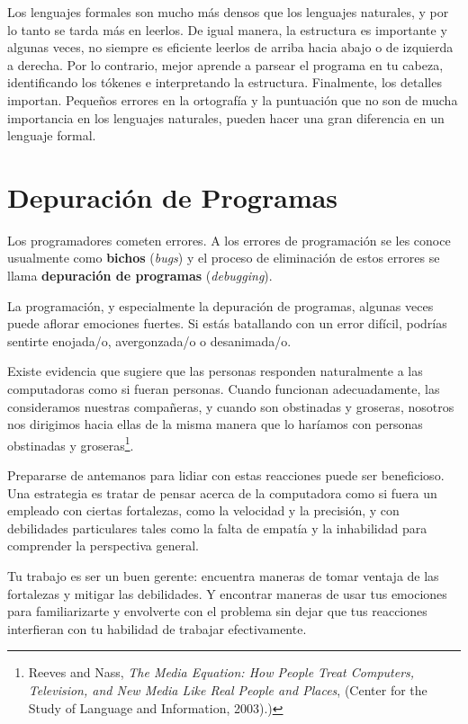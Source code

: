 Los lenguajes formales son mucho más densos que los lenguajes naturales,
y por lo tanto se tarda más en leerlos. De igual manera, la estructura
es importante y algunas veces, no siempre es eficiente leerlos de arriba
hacia abajo o de izquierda a derecha. Por lo contrario, mejor aprende
a parsear el programa en tu cabeza, identificando los tókenes e interpretando
la estructura. Finalmente, los detalles importan. Pequeños errores en 
la ortografía y la puntuación que no son de mucha importancia en los 
lenguajes naturales, pueden hacer una gran diferencia en un lenguaje formal.


\section{Depuración de Programas}

Los programadores cometen errores. A los errores de programación 
se les conoce usualmente como {\bf bichos} ({\em bugs}) y el proceso 
de eliminación de estos errores se llama {\bf depuración de programas} 
({\em debugging}).

La programación, y especialmente la depuración de programas, algunas veces
puede aflorar emociones fuertes. Si estás batallando con un error difícil, podrías
sentirte enojada/o, avergonzada/o o desanimada/o.

Existe evidencia que sugiere que las personas responden naturalmente
a las computadoras como si fueran personas. Cuando funcionan adecuadamente,
las consideramos nuestras compañeras, y cuando son obstinadas y groseras, 
nosotros nos dirigimos hacia ellas de la misma manera que lo 
haríamos con personas obstinadas y groseras\footnote{Reeves and Nass, {\it The Media
    Equation: How People Treat Computers, Television, and New Media
    Like Real People and Places}, (Center for the Study of Language and Information, 2003).)}.

Prepararse de antemanos para lidiar con estas reacciones
puede ser beneficioso. Una estrategia es tratar de pensar acerca
de la computadora como si fuera un empleado con ciertas fortalezas,
como la velocidad y la precisión, y con debilidades particulares 
tales como la falta de empatía y la inhabilidad para comprender
la perspectiva general.

Tu trabajo es ser un buen gerente: encuentra maneras de tomar
ventaja de las fortalezas y mitigar las debilidades. Y encontrar maneras
de usar tus emociones para familiarizarte y envolverte con el problema
sin dejar que tus reacciones interfieran con tu habilidad de trabajar 
efectivamente. 

